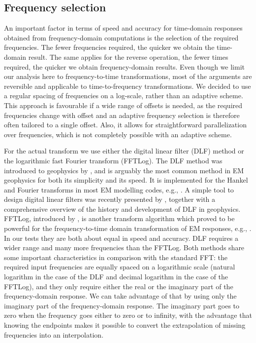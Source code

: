 \documentclass[extra, camera,%
    onecolumn,   %
    referee,     %
]{gji}
\begin{document}
\subsection{Frequency selection}  %

An important factor in terms of speed and accuracy for time-domain responses
obtained from frequency-domain computations is the selection of the required
frequencies. The fewer frequencies required, the quicker we obtain the
time-domain result.  The same applies for the reverse operation, the fewer times required,
the quicker we obtain frequency-domain results. Even though we limit our
analysis here to frequency-to-time transformations, most of the arguments are
reversible and applicable to time-to-frequency transformations. We decided to
use a regular spacing of frequencies on a log-scale, rather than an adaptive
scheme. This approach is favourable if a wide range of offsets is needed, as
the required frequencies change with offset and an adaptive frequency selection
is therefore often tailored to a single offset. Also, it allows for straightforward parallelization over frequencies,
which is not completely possible with an adaptive scheme.

For the actual transform we use either the digital linear filter (DLF) method
or the logarithmic fast Fourier transform (FFTLog). The DLF method was
introduced to geophysics by \cite{GP.71.Ghosh}, and is arguably the most common
method in EM geophysics for both its simplicity and its speed. It is
implemented for the Hankel and Fourier transforms in most EM modelling codes,
e.g., \cite{GEO.09.Key}. A simple tool to design digital linear filters was
recently presented by \cite{GEO.19.Werthmuller}, together with a comprehensive
overview of the history and development of DLF in geophysics. FFTLog,
introduced by \cite{RAS.00.Hamilton}, is another transform algorithm which
proved to be powerful for the frequency-to-time domain transformation of EM
responses, e.g., \cite{INT.14.Werthmuller}. In our tests they are both about
equal in speed and accuracy. DLF requires a wider range and many more
frequencies than the FFTLog. Both methods share some important characteristics
in comparison with the standard FFT: the required input frequencies are equally
spaced on a logarithmic scale (natural logarithm in the case of the DLF and
decimal logarithm in the case of the FFTLog), and they only require either the
real or the imaginary part of the frequency-domain response. We can take
advantage of that by using only the imaginary part of the frequency-domain
response. The imaginary part goes to zero when the frequency goes either to
zero or to infinity, with the advantage that knowing the endpoints makes it
possible to convert the extrapolation of missing frequencies into an
interpolation.
\end{document}
